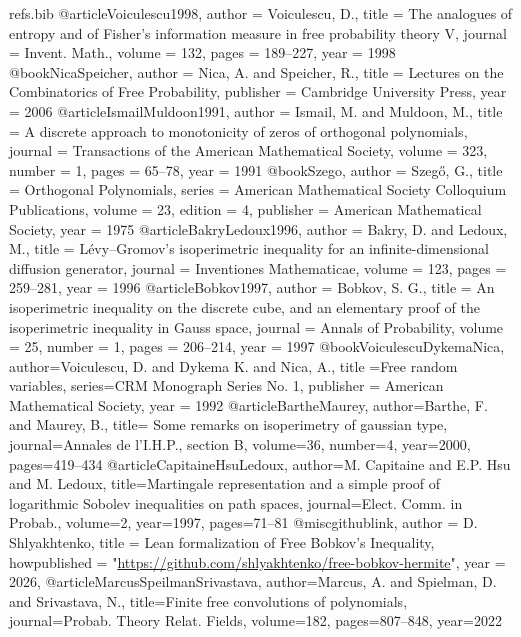 \begin{filecontents}{refs.bib} 
@article{Voiculescu1998,
  author = {Voiculescu, D.},
  title = {The analogues of entropy and of {Fisher}'s information measure in free probability theory {V}},
  journal = {Invent. Math.},
  volume = {132},
  pages = {189--227},
  year = {1998}
}
@book{NicaSpeicher,
  author = {Nica, A. and Speicher, R.},
  title = {Lectures on the Combinatorics of Free Probability},
  publisher = {Cambridge University Press},
  year = {2006}
}
@article{IsmailMuldoon1991,
  author = {Ismail, M. and Muldoon, M.},
  title = {A discrete approach to monotonicity of zeros of orthogonal polynomials},
  journal = {Transactions of the American Mathematical Society},
  volume = {323},
  number = {1},
  pages = {65--78},
  year = {1991}
}
@book{Szego,
  author = {Szegő, G.},
  title = {Orthogonal Polynomials},
  series = {American Mathematical Society Colloquium Publications},
  volume = {23},
  edition = {4},
  publisher = {American Mathematical Society},
  year = {1975}
}
@article{BakryLedoux1996,
  author = {Bakry, D. and Ledoux, M.},
  title = {{Lévy--Gromov}'s isoperimetric inequality for an infinite-dimensional diffusion generator},
  journal = {Inventiones Mathematicae},
  volume = {123},
  pages = {259--281},
  year = {1996}
}
@article{Bobkov1997,
  author = {Bobkov, S. G.},
  title = {An isoperimetric inequality on the discrete cube, and an elementary proof of the isoperimetric inequality in {Gauss} space},
  journal = {Annals of Probability},
  volume = {25},
  number = {1},
  pages = {206--214},
  year = {1997}
}
@book{VoiculescuDykemaNica,
    author={Voiculescu, D. and Dykema K. and Nica, A.},
    title ={Free random variables}, 
    series={CRM Monograph Series No. 1},
    publisher = {American Mathematical Society},
    year = {1992}
}
@article{BartheMaurey,
    author={Barthe, F. and  Maurey, B.},
    title={ Some remarks on isoperimetry of gaussian type},
    journal={Annales de l’I.H.P., section B},
    volume={36}, number={4},
    year={2000}, 
    pages={419--434}
}
@article{CapitaineHsuLedoux,
    author={M. Capitaine and E.P. Hsu and M. Ledoux},
    title={Martingale representation and a simple proof of
logarithmic {Sobolev} inequalities on path spaces}, 
    journal={Elect. Comm. in Probab.},
    volume={2},
    year={1997},
    pages={71--81}
}
@misc{githublink,
  author = {D. Shlyakhtenko},
  title = {Lean formalization of Free Bobkov's Inequality},
  howpublished = "\url{https://github.com/shlyakhtenko/free-bobkov-hermite}",
  year = {2026}, 
}
@article{MarcusSpeilmanSrivastava,
    author={Marcus, A. and Spielman, D. and Srivastava, N.},
    title={Finite free convolutions of polynomials},
    journal={Probab. Theory Relat. Fields},
    volume=182, 
    pages={807--848},
    year=2022}
    
\end{filecontents}
\documentclass{article}
\usepackage{amsmath,amsfonts,amssymb,amsthm,url}


